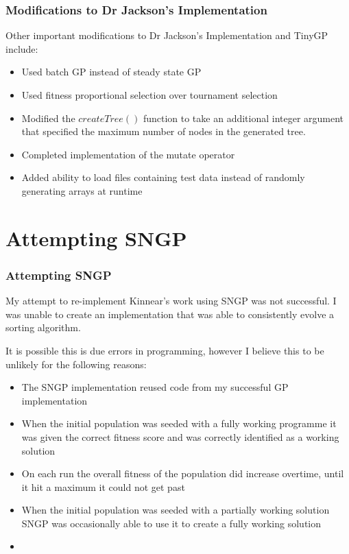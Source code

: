 \documentclass{beamer}
\begin{document}
		\begin{frame}
		
			\frametitle{Modifications to Dr Jackson's Implementation}
			
			Other important modifications to Dr Jackson's Implementation and TinyGP include:
			
			\begin{itemize}
				\pause
				\item Used batch GP instead of steady state GP
				\pause
				\item Used fitness proportional selection over tournament selection
				\pause
				\item Modified the $createTree()$ function to take an additional integer argument that specified the maximum number of nodes in the generated tree.
				\pause
				\item Completed implementation of the mutate operator
				\pause
				\item Added ability to load files containing test data instead of randomly generating arrays at runtime
			\end{itemize}
		
		\end{frame}
	
	\section{Attempting SNGP}
	
		\begin{frame}
		
			\frametitle{Attempting SNGP}
			
			My attempt to re-implement Kinnear's work using SNGP was not successful. I was unable to create an implementation that was able to consistently evolve a sorting algorithm.
			
			It is possible this is due errors in programming, however I believe this to be unlikely for the following reasons:
			
			\begin{itemize}
				\item The SNGP implementation reused code from my successful GP implementation
				\item When the initial population was seeded with a fully working programme it was given the correct fitness score and was correctly identified as a working solution
				\item On each run the overall fitness of the population did increase overtime, until it hit a maximum it could not get past
				\item When the initial population was seeded with a partially working solution SNGP was occasionally able to use it to create a fully working solution
				\item 
			\end{itemize}
		
		\end{frame}
	
\end{document}
